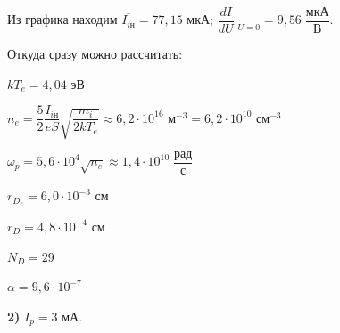 \documentclass[a4paper,12pt]{article} %
\begin{document}
Из графика находим $\overline{I_{i\text{н}}} = 77,15$ мкА;  $\dfrac{dI}{dU}\bigg|_{U = 0} = 9,56 \; \dfrac{\text{мкА}}{\text{В}}$.

Откуда сразу можно рассчитать:

$\boxed{kT_e = 4,04 \text{ эВ}}$
\vspace{3mm}

$\boxed{n_e = \dfrac{5}{2}\dfrac{I_{i\text{н}}}{eS}\sqrt{\dfrac{m_i}{2kT_e}} \approx 6,2\cdot 10^{16} \text{ м}^{-3} = 6,2\cdot 10^{10} \text{ см}^{-3}} $
\vspace{3mm}

$\boxed{\omega_p = 5,6\cdot 10^{4}\sqrt{n_e} \approx 1,4\cdot 10^{10}\;\dfrac{\text{рад}}{\text{с}}}$
\vspace{3mm}

$\boxed{r_{D_e} = 6,0\cdot 10^{-3}\text{ см}}$
\vspace{3mm}

$\boxed{r_D = 4,8\cdot 10^{-4}\text{ см}}$
\vspace{3mm}

$\boxed{N_D = 29}$
\vspace{3mm}

$\boxed{\alpha = 9,6\cdot 10^{-7}}$


\newpage

\textbf{2)} $I_p = 3$ мА.
\end{document}
